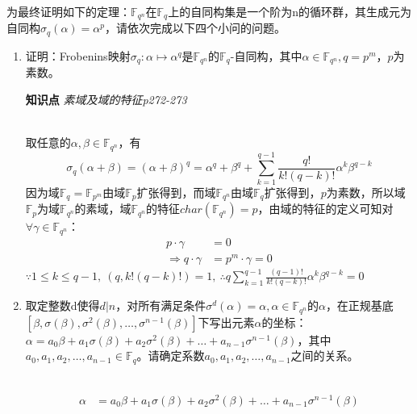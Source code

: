 为最终证明如下的定理：$\mathbb{F}_{q^n}$在$\mathbb{F}_{q}$上的自同构集是一个阶为n的循环群，其生成元为自同构$\sigma_q(\alpha)=\alpha^p$，请依次完成以下四个小问的问题。
\begin{enumerate}
    \item 证明：Frobenins映射$\sigma_q:\alpha\mapsto\alpha^q$是$\mathbb{F}_{q^n}$的$\mathbb{F}_{q}$-自同构，其中$\alpha\in\mathbb{F}_{q^n}, q=p^m$，$p$为素数。
    \begin{tcolorbox}
        \textbf{知识点} 
        \textit{素域及域的特征p272-273}
    \end{tcolorbox}
    \begin{solution}\ \\
        取任意的$\alpha, \beta\in\mathbb{F}_{q^n}$，有
        \begin{equation*}
            \sigma_q(\alpha+\beta)=(\alpha+\beta)^q=\alpha^q+\beta^q+\sum\limits_{k=1}^{q-1}\frac{q!}{k!(q-k)!}\alpha^k\beta^{q-k}
        \end{equation*}
        因为域$\mathbb{F}_{q}=\mathbb{F}_{p^m}$由域$\mathbb{F}_{p}$扩张得到，而域$\mathbb{F}_{q^n}$由域$\mathbb{F}_{q}$扩张得到，$p$为素数，所以域$\mathbb{F}_{p}$为域$\mathbb{F}_{q^n}$的素域，域$\mathbb{F}_{q^n}$的特征$char(\mathbb{F}_{q^n})=p$，由域的特征的定义可知对$\forall\gamma\in\mathbb{F}_{q^n}$：
        \begin{equation*}
            \begin{aligned}
                p\cdot\gamma&=0\\ \Rightarrow q\cdot\gamma&=p^m\cdot\gamma=0
            \end{aligned}
        \end{equation*}
        $\because1\leq k\leq q-1,\ (q, k!(q-k)!)=1,\ \therefore q\sum\limits_{k=1}^{q-1}\frac{(q-1)!}{k!(q-k)!}\alpha^k\beta^{q-k}=0$
    \end{solution}
    \item 取定整数d使得$d|n$，对所有满足条件$\sigma^d(\alpha)=\alpha, \alpha\in\mathbb{F}_{q^n}$的$\alpha$，在正规基底$[\beta,\sigma(\beta),\sigma^2(\beta),\dots,\sigma^{n-1}(\beta)]$下写出元素$\alpha$的坐标：$\alpha=a_0\beta+a_1\sigma(\beta)+a_2\sigma^2(\beta)+\dots+a_{n-1}\sigma^{n-1}(\beta)$，其中$a_0,a_1,a_2,\dots,a_{n-1}\in\mathbb{F}_{q}$。请确定系数$a_0,a_1,a_2,\dots,a_{n-1}$之间的关系。
    \begin{solution}\ \\
        \begin{equation*}
            \begin{aligned}
                \alpha&=a_0\beta+a_1\sigma(\beta)+a_2\sigma^2(\beta)+\dots+a_{n-1}\sigma^{n-1}(\beta)\\

\end{aligned}
\end{equation*}
\end{solution}
\end{enumerate}
